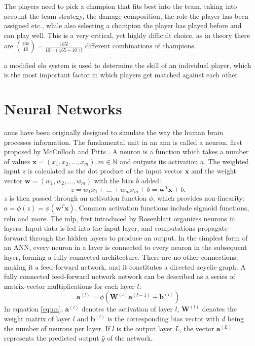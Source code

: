 \documentclass[12pt, a4paper, headinclude, twoside, plainheadsepline, open=right, numbers=noenddot, hidelinks, toc=listof, toc=bibliography]{scrreprt}
\begin{document}
The players need to pick a champion that fits best into the team, taking into account the team strategy, the damage composition, the role the player has been assigned etc., while also selecting a champion the player has played before and can play well.
This is a very critical, yet highly difficult choice, as in theory there are $\binom{165}{10} = \frac{165!}{10! \cdot (165-10)!}$ different combinations of champions.




a modified elo system  is used to determine the skill of an individual player, which is the most important factor in which players get matched against each other


\section{Neural Networks}
\label{sec:nn}

\Acp{ann} have been originally designed to simulate the way the human brain processes information.
The fundamental unit in an \ac{ann} is called a neuron, first proposed by McCulloch and Pitts  \cite{mccullochLogicalCalculusIdeas1943}.
A neuron is a function which takes a number of values $ \mathbf{x} = (x_1, x_2, ... , x_m), m \in \mathbb{N}$ and outputs its activation $a$.
The weighted input $z$ is calculated as the dot product of the input vector $\mathbf{x}$ and the weight vector $\mathbf{w} = (w_1, w_2, ... , w_m)$ with the bias $b$ added:
\begin{equation}
z = w_1 x_1 + ... + w_m x_m + b = \mathbf{w}^T \mathbf{x} + b.
\end{equation}
$z$ is then passed through an activation function $\phi$, which provides non-linearity:
$a = \phi(z) = \phi(\mathbf{w}^T \mathbf{x})$.
Common activation functions include sigmoid functions, \ac{relu} and more.
The \ac{mlp}, first introduced by Rosenblatt \cite{rosenblattPerceptronProbabilisticModel1958} organizes neurons in layers.
Input data is fed into the input layer, and computations propagate forward through the hidden layers to produce an output.
In the simplest form of an ANN, every neuron in a layer is connected to every neuron in the subsequent layer, forming a fully connected architecture.
There are no other connections, making it a feed-forward network, and it constitutes a directed acyclic graph.
A fully connected feed-forward network network can be described as a series of matrix-vector multiplications for each layer $l$:
\begin{equation}
\label{eq:nn}
\mathbf{a}^{(l)} = \phi (\mathbf{W}^{(l)} \mathbf{a}^{(l-1)} + \mathbf{b}^{(l)})
\end{equation}
In equation \ref{eq:nn}, $\mathbf{a}^{(l)}$ denotes the activation of layer $l$, $\mathbf{W}^{(l)}$ denotes the weight matrix of layer $l$ and $\mathbf{b}^{(l)}$ is the corresponding bias vector with $d$ being the number of neurons per layer.
If $l$ is the output layer $L$, the vector $\mathbf{a}^{(L)}$ represents the predicted output $\hat{y}$ of the network.
\end{document}
